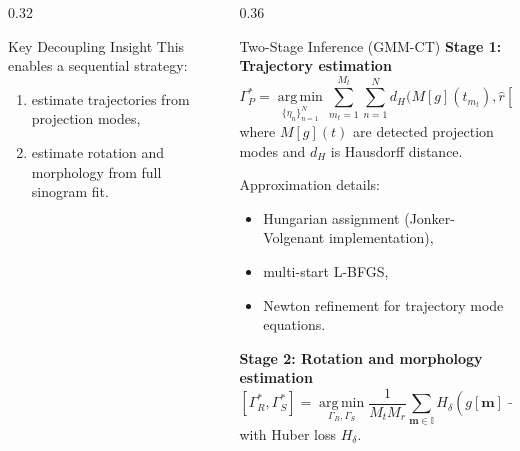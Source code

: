 \documentclass[final]{beamer}
\newcommand{\argmin}{\operatorname*{arg\,min}}
\newcommand{\I}{\mathbb{I}}
\begin{document}
\begin{frame}[t]
\begin{columns}[t,totalwidth=\textwidth]
\begin{column}{0.32\textwidth}
\begin{alertblock}{Key Decoupling Insight}
This enables a sequential strategy:
\begin{enumerate}
\item estimate trajectories from projection modes,
\item estimate rotation and morphology from full sinogram fit.
\end{enumerate}
\end{alertblock}

\end{column}

\begin{column}{0.36\textwidth}

\begin{block}{Two-Stage Inference (GMM-CT)}
\textbf{Stage 1: Trajectory estimation}
\[
\Gamma_P^* = \argmin_{\{\eta_n\}_{n=1}^N}
\sum_{m_t=1}^{M_t}\sum_{n=1}^{N}
 d_H\bigl(M[g](t_{m_t}),\widehat{r}[\eta_n](t_{m_t})\bigr),
\]
where $M[g](t)$ are detected projection modes and $d_H$ is Hausdorff distance.

\vspace{0.4em}
Approximation details:
\begin{itemize}
\item Hungarian assignment (Jonker-Volgenant implementation),
\item multi-start L-BFGS,
\item Newton refinement for trajectory mode equations.
\end{itemize}

\vspace{0.5em}
\textbf{Stage 2: Rotation and morphology estimation}
\[
[\Gamma_R^*,\Gamma_S^*] =
\argmin_{\Gamma_R,\Gamma_S}
\frac{1}{M_tM_r}\sum_{\bm{m}\in\I}
H_\delta\!\left(g[\bm{m}] - F[\Gamma_P^*,\Gamma_R,\Gamma_S](\bm{m})\right),
\]
with Huber loss $H_\delta$.
\end{block}


\end{column}
\end{columns}
\end{frame}
\end{document}
